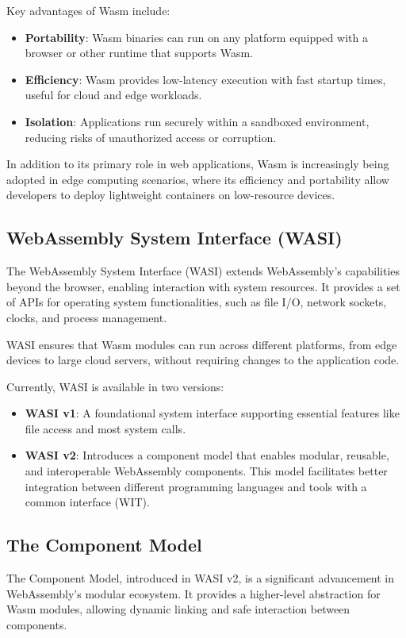 Key advantages of Wasm include:
\begin{itemize}
\item \textbf{Portability}: Wasm binaries can run on any platform equipped with a browser or other runtime that supports Wasm.
\item \textbf{Efficiency}: Wasm provides low-latency execution with fast startup times, useful for cloud and edge workloads.
\item \textbf{Isolation}: Applications run securely within a sandboxed environment, reducing risks of unauthorized access or corruption.
\end{itemize}

In addition to its primary role in web applications, Wasm is increasingly being adopted in edge computing scenarios, where its efficiency and portability allow developers to deploy lightweight containers on low-resource devices.

\subsection{WebAssembly System Interface (WASI)}
The WebAssembly System Interface (WASI) extends WebAssembly's capabilities beyond the browser, enabling interaction with system resources. It provides a set of APIs for operating system functionalities, such as file I/O, network sockets, clocks, and process management.

WASI ensures that Wasm modules can run across different platforms, from edge devices to large cloud servers, without requiring changes to the application code.

Currently, WASI is available in two versions:
\begin{itemize}
\item \textbf{WASI v1}: A foundational system interface supporting essential features like file access and most system calls.
\item \textbf{WASI v2}: Introduces a component model that enables modular, reusable, and interoperable WebAssembly components. This model facilitates better integration between different programming languages and tools with a common interface (WIT).
\end{itemize}

\subsection{The Component Model}
The Component Model, introduced in WASI v2, is a significant advancement in WebAssembly's modular ecosystem. It provides a higher-level abstraction for Wasm modules, allowing dynamic linking and safe interaction between components.

